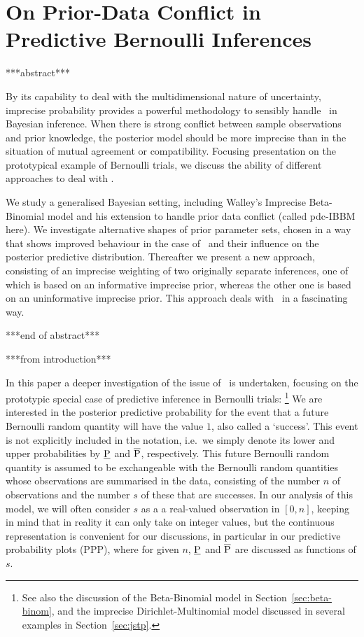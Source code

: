 \section{On Prior-Data Conflict in Predictive Bernoulli Inferences}
\label{sec:isipta11}

***abstract***

By its capability to deal with the multidimensional nature of
uncertainty, imprecise probability provides a powerful methodology
to sensibly handle \pdc\ in Bayesian inference. When there is
strong conflict between sample observations and prior knowledge, the posterior model should be more imprecise
than in the situation of mutual agreement or compatibility. Focusing
presentation on the prototypical example of Bernoulli
trials, we discuss the ability of different approaches to deal with \pdc.

We study a generalised Bayesian setting, including Walley's Imprecise Beta-Binomial model
and his extension to handle prior data conflict (called pdc-IBBM here).
We investigate alternative shapes of prior parameter sets, chosen in a way that shows improved
behaviour in the case of \pdc\ and their influence on the posterior predictive distribution.
Thereafter we present a new approach, consisting of an
imprecise weighting of two originally separate inferences, one of which is based on an informative
imprecise prior, whereas the other one is based on an uninformative imprecise prior. This approach
deals with \pdc\ in a fascinating way.

***end of abstract***

\medskip

***from introduction***

In this paper a deeper investigation of the issue of \pdc\ is undertaken,
focusing on the prototypic special case of predictive inference in Bernoulli trials:%
\footnote{See also the discussion of the Beta-Binomial model in Section~\ref{sec:beta-binom},
and the imprecise Dirichlet-Multinomial model discussed in several examples in Section~\ref{sec:jstp}.}
We are interested in the posterior predictive
probability for the event that a future Bernoulli random quantity
will have the value $1$, also called a `success'. This event is not
explicitly included in the notation, i.e.\ we simply denote its lower
and upper probabilities by $\underline{\operatorname{P}}$ and $\overline{\operatorname{P}}$, respectively. This future Bernoulli random
quantity is assumed to be exchangeable with the Bernoulli random
quantities whose observations are summarised in the data, consisting
of the number $n$ of observations and the number $s$ of these that are
successes. In our analysis of this model, we
will often consider $s$ as a a real-valued observation in $[0,n]$,
keeping in mind that in reality it can only take on
integer values, but the continuous representation is convenient for
our discussions, in particular in our predictive probability plots (PPP),
where for given $n$, $\underline{\operatorname{P}}$ and $\overline{\operatorname{P}}$ are discussed as functions of $s$.

